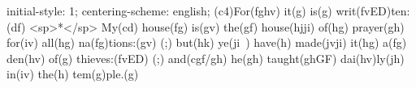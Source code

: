 initial-style: 1;
centering-scheme: english;
(c4)For(fghv) it(g) is(g) writ(fvED)ten:(df) <sp>*</sp> My(cd) house(fg) is(gv) the(gf) house(hjji) of(hg) prayer(gh) for(iv) all(hg) na(fg)tions:(gv) (;) but(hk) ye(ji~) have(h) made(jvji) it(hg) a(fg) den(hv) of(g) thieves:(fvED) (;) and(cgf/gh) he(gh) taught(ghGF) dai(hv)ly(jh) in(iv) the(h) tem(g)ple.(g)
